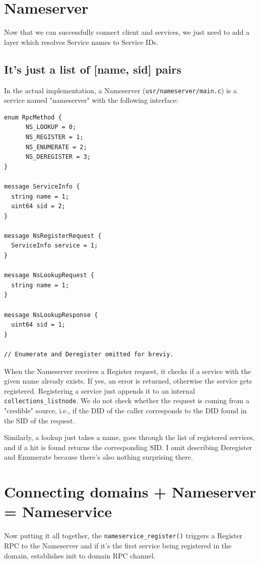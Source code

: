\section{Nameserver}
Now that we can successfully connect client and services, we just need to add a layer which resolves Service names to Service IDs.

\subsection{It's just a list of [name, sid] pairs}
In the actual implementation, a Nameserver (\texttt{usr/nameserver/main.c}) is a service named "nameserver" with the following interface:
\begin{verbatim}
enum RpcMethod {
      NS_LOOKUP = 0;
      NS_REGISTER = 1;
      NS_ENUMERATE = 2;
      NS_DEREGISTER = 3;
}

message ServiceInfo {
  string name = 1;
  uint64 sid = 2;
}

message NsRegisterRequest {
  ServiceInfo service = 1;
}

message NsLookupRequest {
  string name = 1;
}

message NsLookupResponse {
  uint64 sid = 1;
}

// Enumerate and Deregister omitted for breviy.
\end{verbatim}

When the Nameserver receives a Register request, it checks if a service with the given name already exists. If yes, an error is returned, otherwise the service gets registered. Registering a service just appends it to an internal \texttt{collections_listnode}. We do not check whether the request is coming from a "credible" source, i.e., if the DID of the caller corresponds to the DID found in the SID of the request. 

Similarly, a lookup just takes a name, goes through the list of registered services, and if a hit is found returns the corresponding SID. I omit describing Deregister and Enumerate because there's also nothing surprising there.

\section{Connecting domains + Nameserver = Nameservice}
Now putting it all together, the \texttt{nameservice_register()} triggers a Register RPC to the Nameserver and if it's the first service being registered in the domain, establishes init to domain RPC channel.

